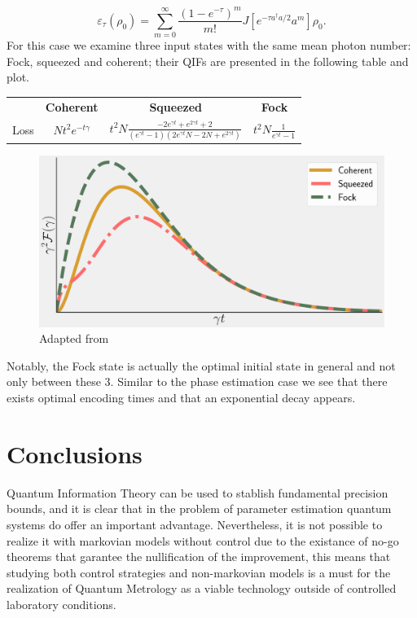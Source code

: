 \begin{equation}
 \varepsilon_{\tau}(\rho_{0}) = \sum_{m=0}^{\infty}\frac{(1-e^{-\tau})^{m}}{m!}J[e^{-\tau a^{\dagger}a/2}a^{m}]\rho_{0}.
\end{equation}
For this case we examine three input states with the same mean photon number: Fock, squeezed and coherent;
their QIFs are presented in the following table and plot.

\begin{center}
      \begin{tabular}{c c c c }
        &\textbf{Coherent} & \textbf{Squeezed}  & \textbf{Fock}   \\
        Loss & $N t^{2}e^{-t\gamma}$ & $ t^{2}N \frac{-2e^{\gamma t} +e^{2\gamma t}+2}{(e^{\gamma t}-1)(2e^{\gamma t}N-2N +e^{2\gamma t})}$ & $t^{2}N \frac{1}{e^{\gamma t}-1}$\\
      \end{tabular}
      \label{tab:table1}
\end{center}

\begin{figure}[h]
    \centering
    \includegraphics[scale=0.35]{Images/Loss_QFI_Plot.pdf}
    \caption{Adapted from \cite{rossi_2016}}
\end{figure}

Notably, the Fock state is actually the optimal initial state \cite{adesso_optimal_2009} in general and not
only between these 3. Similar to the phase estimation case we see that there exists optimal encoding times and that an exponential decay appears.

\chapter{Conclusions}
Quantum Information Theory can be used to stablish fundamental precision bounds, and it is clear that in the problem of parameter estimation  quantum systems do offer an important advantage. Nevertheless, it is not possible to realize it with markovian models without control due to the
existance of no-go theorems that garantee the nullification of the improvement, this means that studying both control strategies and
non-markovian models is a must for the realization of Quantum Metrology as a viable technology outside of controlled laboratory conditions.
